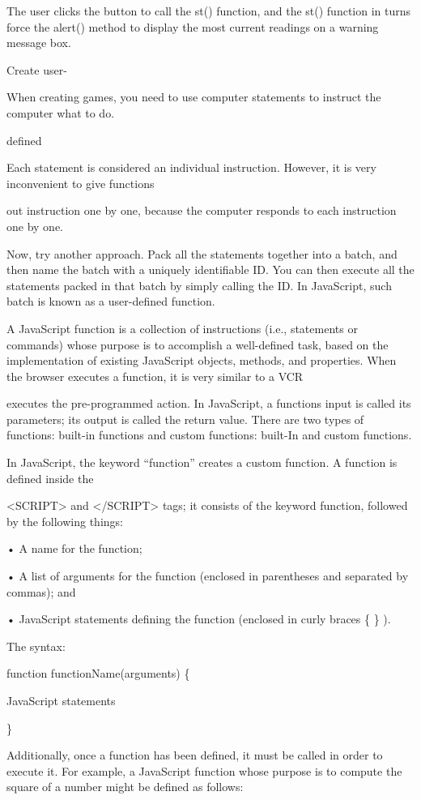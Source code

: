 \documentclass[
]{article}
\begin{document}
The user clicks the button to call the st() function, and the st()
function in turns force the alert() method to display the most current
readings on a warning message box.

Create user-

When creating games, you need to use computer statements to instruct the
computer what to do.

defined

Each statement is considered an individual instruction. However, it is
very inconvenient to give functions

out instruction one by one, because the computer responds to each
instruction one by one.

Now, try another approach. Pack all the statements together into a
batch, and then name the batch with a uniquely identifiable ID. You can
then execute all the statements packed in that batch by simply calling
the ID. In JavaScript, such batch is known as a user-defined function.

A JavaScript function is a collection of instructions (i.e., statements
or commands) whose purpose is to accomplish a well-defined task, based
on the implementation of existing JavaScript objects, methods, and
properties. When the browser executes a function, it is very similar to
a VCR

executes the pre-programmed action. In JavaScript, a
function\textquotesingle s input is called its parameters; its output is
called the return value. There are two types of functions: built-in
functions and custom functions: built-In and custom functions.

In JavaScript, the keyword ``function'' creates a custom function. A
function is defined inside the

\textless SCRIPT\textgreater{} and \textless/SCRIPT\textgreater{} tags;
it consists of the keyword function, followed by the following things:

• A name for the function;

• A list of arguments for the function (enclosed in parentheses and
separated by commas); and

• JavaScript statements defining the function (enclosed in curly braces
\{ \} ).

The syntax:

function functionName(arguments) \{

JavaScript statements

\}

Additionally, once a function has been defined, it must be called in
order to execute it. For example, a JavaScript function whose purpose is
to compute the square of a number might be defined as follows:
\end{document}

